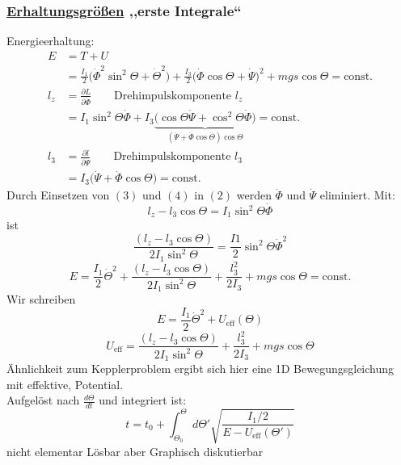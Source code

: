 \documentclass[titlepage,12pt,a4paper,ngerman]{report}
\newcommand{\tx}[1]{\textrm{#1}}
\newcommand{\ub}[1]{\underbrace{#1}}
\newcommand{\const}{\tx{const.}}
\begin{document}
\subsubsection{\underline{Erhaltungsgrößen} ,,erste Integrale``}
Energieerhaltung:
\begin{align*}
E &= T+U \\
&= \frac{I_1}{2} \bigg( \dot{\Phi} ^2 \sin^2 \Theta + \dot{\Theta}^2 \bigg) + \frac{I_3}{2} \bigg( \dot{\Phi} \cos \Theta + \dot{\Psi} \bigg) ^2 + mgs\cos \Theta = \const \tag{2}\\[20pt]
l_z &= \frac{\partial L}{\partial \dot{\Phi}}\qquad  \tx{Drehimpulskomponente } l_z\\
&= I_1 \sin^2 \Theta \dot{\Phi} + I_3 \ub{ \bigg( \cos \Theta \dot{\Psi} + \cos^2 \Theta \dot{\Phi} \bigg) }_{(\dot{\Psi} + \dot{\Phi} \cos \Theta) \cos \Theta} = \const \tag{3}\\[10pt]
l_3 &= \frac{\partial l}{\partial \dot{\Psi}} \qquad \tx{Drehimpulskomponente } l_3 \\
&= I_3 \bigg( \dot{\Psi} + \dot{\Phi} \cos \Theta \bigg) = \const \tag{4}
\end{align*}
Durch Einsetzen von $(3)$ und $(4)$ in $(2)$ werden $ \dot{\Phi} $ und $ \dot{\Psi} $ eliminiert. Mit:
\begin{equation*}
l_z - l_3 \cos \Theta = I_1 \sin^2 \Theta \dot{\Phi} \tag{5}
\end{equation*}
ist 
\begin{equation*}
\frac{(l_z - l_3 \cos \Theta)}{2 I_1 \sin^2 \Theta} = \frac{I1}{2} \sin^2 \Theta \dot{\Phi}^2 \tag*{in (2)}
\end{equation*}
\begin{equation*}
E = \frac{I_1}{2} \dot{\Theta}^2 + \frac{(l_z - l_3 \cos \Theta)}{2 I_1 \sin^2 \Theta} + \frac{l_3^2}{2 I_3} + mgs \cos \Theta = \const \tag{6}
\end{equation*}
Wir schreiben
$$E = \frac{I_1}{2} \dot{\Theta}^2 + U_{\tx{eff}} (\Theta)$$
\begin{equation*}
U_{\tx{eff}} = \frac{(l_z - l_3 \cos \Theta)}{2 I_1 \sin^2 \Theta} + \frac{l_3^2}{2 I_3} + mgs \cos \Theta \tag{7}
\end{equation*}
Ähnlichkeit zum Kepplerproblem ergibt sich hier eine 1D Bewegungsgleichung mit effektive, Potential.\\
Aufgelöst nach $ \frac{d\Theta}{dt} $ und integriert ist:
\begin{equation*}
t = t_0 + \int_{\Theta_0}^{\Theta} d \Theta' \sqrt{\frac{I_1/2}{E - U_{\tx{eff}} (\Theta')}}
\end{equation*}
nicht elementar Lösbar aber Graphisch diskutierbar
\end{document}

